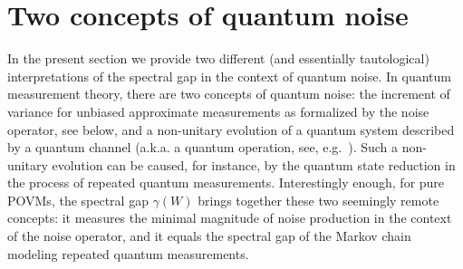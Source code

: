 \documentclass[11pt]{article}
\theoremstyle{definition}
\numberwithin{equation}{section}
\numberwithin{figure}{section}
\numberwithin{table}{section}
\newcommand\< {\mathcal{h}}
\renewcommand\> {\mathcal{i}}
\begin{document}
\section{Two concepts of quantum noise}\label{sec-noise}
In the present section we provide two different (and essentially tautological) interpretations of the spectral gap in the context of quantum noise. In quantum measurement theory, there are two concepts of quantum noise: the increment of variance for unbiased approximate measurements as formalized by the noise operator, see below, and a non-unitary evolution of a quantum system described by a quantum channel (a.k.a. a quantum operation, see, e.g.~\cite[Chapter~8]{NC}). Such a non-unitary evolution can be caused, for instance, by the quantum state reduction in the process of repeated quantum measurements. Interestingly enough, for pure POVMs, the spectral gap $\gamma(W)$ brings together these two seemingly remote concepts: it measures the minimal magnitude of noise production in the context of the noise operator, and it equals the spectral gap of the Markov chain modeling repeated quantum measurements.
\end{document}
